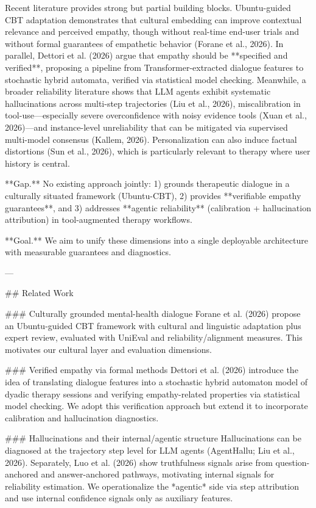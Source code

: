 Recent literature provides strong but partial building blocks. Ubuntu-guided CBT adaptation demonstrates that cultural embedding can improve contextual relevance and perceived empathy, though without real-time end-user trials and without formal guarantees of empathetic behavior (Forane et al., 2026). In parallel, Dettori et al. (2026) argue that empathy should be **specified and verified**, proposing a pipeline from Transformer-extracted dialogue features to stochastic hybrid automata, verified via statistical model checking. Meanwhile, a broader reliability literature shows that LLM agents exhibit systematic hallucinations across multi-step trajectories (Liu et al., 2026), miscalibration in tool-use—especially severe overconfidence with noisy evidence tools (Xuan et al., 2026)—and instance-level unreliability that can be mitigated via supervised multi-model consensus (Kallem, 2026). Personalization can also induce factual distortions (Sun et al., 2026), which is particularly relevant to therapy where user history is central.

**Gap.** No existing approach jointly:  
1) grounds therapeutic dialogue in a culturally situated framework (Ubuntu-CBT),  
2) provides **verifiable empathy guarantees**, and  
3) addresses **agentic reliability** (calibration + hallucination attribution) in tool-augmented therapy workflows.

**Goal.** We aim to unify these dimensions into a single deployable architecture with measurable guarantees and diagnostics.

---

## Related Work  

### Culturally grounded mental-health dialogue  
Forane et al. (2026) propose an Ubuntu-guided CBT framework with cultural and linguistic adaptation plus expert review, evaluated with UniEval and reliability/alignment measures. This motivates our cultural layer and evaluation dimensions.

### Verified empathy via formal methods  
Dettori et al. (2026) introduce the idea of translating dialogue features into a stochastic hybrid automaton model of dyadic therapy sessions and verifying empathy-related properties via statistical model checking. We adopt this verification approach but extend it to incorporate calibration and hallucination diagnostics.

### Hallucinations and their internal/agentic structure  
Hallucinations can be diagnosed at the trajectory step level for LLM agents (AgentHallu; Liu et al., 2026). Separately, Luo et al. (2026) show truthfulness signals arise from question-anchored and answer-anchored pathways, motivating internal signals for reliability estimation. We operationalize the *agentic* side via step attribution and use internal confidence signals only as auxiliary features.

